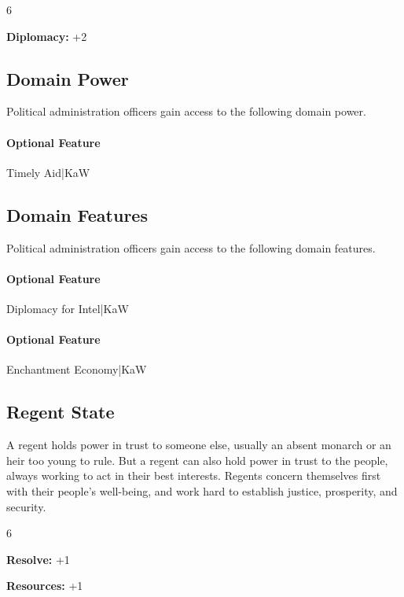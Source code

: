 \documentclass[10pt,a4paper,twoside,bg=print,twocolumn,openany,nodeprecatedcode]{dndbook}
\begin{document}
\begin{itemize}
\begin{multicols}{6}
\item \textbf{Diplomacy:} +2
\end{multicols}

\end{itemize}

\subsection{Domain Power}
Political administration officers gain access to the following domain power.

\paragraph{Optional Feature}
Timely Aid|KaW

\subsection{Domain Features}
Political administration officers gain access to the following domain features.

\paragraph{Optional Feature}
Diplomacy for Intel|KaW

\paragraph{Optional Feature}
Enchantment Economy|KaW

\subsection{Regent State}
A regent holds power in trust to someone else, usually an absent monarch or an heir too young to rule. But a regent can also hold power in trust to the people, always working to act in their best interests. Regents concern themselves first with their people's well-being, and work hard to establish justice, prosperity, and security.

{\par \vspace { 9pt plus 3pt minus 3pt } \noindent  {} \nopagebreak }

\begin{itemize}
\begin{multicols}{6}
\item \textbf{Resolve:} +1
\item \textbf{Resources:} +1
\end{multicols}

\end{itemize}
\end{document}
